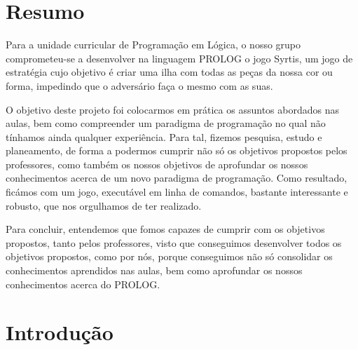 \documentclass[a4paper]{article}
\begin{document}

\newpage

\section*{Resumo}

Para a unidade curricular de Programação em Lógica, o nosso grupo comprometeu-se a desenvolver na linguagem PROLOG o jogo Syrtis, um jogo de estratégia cujo objetivo é criar uma ilha com todas as peças da nossa cor ou forma, impedindo que o adversário faça o mesmo com as suas.

O objetivo deste projeto foi colocarmos em prática os assuntos abordados nas aulas, bem como compreender um paradigma de programação no qual não tínhamos ainda qualquer experiência. Para tal, fizemos pesquisa, estudo e planeamento, de forma a podermos cumprir não só os objetivos propostos pelos professores, como também os nossos objetivos de aprofundar os nossos conhecimentos acerca de um novo paradigma de programação. Como resultado, ficámos com um jogo, executável em linha de comandos, bastante interessante e robusto, que nos orgulhamos de ter realizado.

Para concluir, entendemos que fomos capazes de cumprir com os objetivos propostos, tanto pelos professores, visto que conseguimos desenvolver todos os objetivos propostos, como por nós, porque conseguimos não só consolidar os conhecimentos aprendidos nas aulas, bem como aprofundar os nossos conhecimentos acerca do PROLOG.
\newpage

\tableofcontents



\newpage

\section{Introdução}
\end{document}
